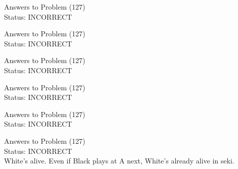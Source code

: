 \documentclass[11pt]{article}
\begin{document}
\begin{minipage}[t]{0.5\textwidth}
  {\centering
  
  Answers to Problem (127)\\
  Status: INCORRECT\\
  
  }
\end{minipage}
\begin{minipage}[t]{0.5\textwidth}
  {\centering
  
  Answers to Problem (127)\\
  Status: INCORRECT\\
  
  }
\end{minipage}
\begin{minipage}[t]{0.5\textwidth}
  {\centering
  
  Answers to Problem (127)\\
  Status: INCORRECT\\
  
  }
\end{minipage}
\begin{minipage}[t]{0.5\textwidth}
  {\centering
  
  Answers to Problem (127)\\
  Status: INCORRECT\\
  
  }
\end{minipage}
\begin{minipage}[t]{0.5\textwidth}
  {\centering
  
  Answers to Problem (127)\\
  Status: INCORRECT\\
  
  }
\end{minipage}
\begin{minipage}[t]{0.5\textwidth}
  {\centering
  
  Answers to Problem (127)\\
  Status: INCORRECT\\
  White's alive. Even if Black plays at A next, White's already alive in seki.\\
  }
\end{minipage}
\end{document}
